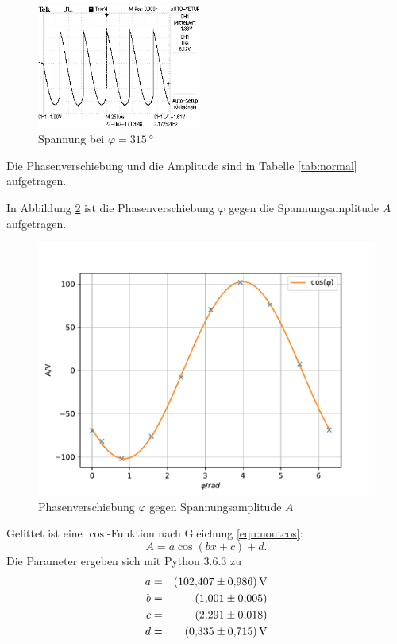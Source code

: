\begin{figure}[h!]
  \centering
  \includegraphics[width=0.48\textwidth]{315gradnormal.JPG}
  \caption{Spannung bei $\varphi=\SI{315}{°}$}
  \label{fig:315gradnormal}
\end{figure}
\FloatBarrier
Die Phasenverschiebung und die Amplitude sind in Tabelle \ref{tab:normal} aufgetragen.

In Abbildung \ref{fig:refplot} ist die Phasenverschiebung $\varphi$ gegen die Spannungsamplitude $A$ aufgetragen.
\FloatBarrier
\begin{figure}[h!]
  \centering
  \includegraphics[width=\textwidth]{ref.pdf}
  \caption{Phasenverschiebung $\varphi$ gegen Spannungsamplitude $A$}
  \label{fig:refplot}
\end{figure}
\FloatBarrier
Gefittet ist eine $\cos$-Funktion nach Gleichung \eqref{eqn:uoutcos}:
\begin{equation*}
  A= a \cos{(bx+c)}+d.
\end{equation*}
Die Parameter ergeben sich mit Python 3.6.3 zu
\begin{align*}
  a &=& \SI{102.407   \pm 0.986}{V} \\
  b &=& \SI{  1.001   \pm 0.005}{}\\
  c &=& \SI{  2.291   \pm 0.018}{} \\
  d &=& \SI{  0.335   \pm 0.715}{V}  \\
\end{align*}
